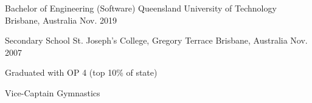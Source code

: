 

\begin{cventries}

  \cventry
    {Bachelor of Engineering (Software)} %
    {Queensland University of Technology} %
    {Brisbane, Australia} %
    {Nov. 2019} %
    {}

  \cventry
    {Secondary School} %
    {St. Joseph's College, Gregory Terrace} %
    {Brisbane, Australia} %
    {Nov. 2007} %
    {
      \begin{cvitems} %
        \item {Graduated with OP 4 (top 10\% of state)}
        \item {Vice-Captain Gymnastics}
      \end{cvitems}
    }

\end{cventries}
